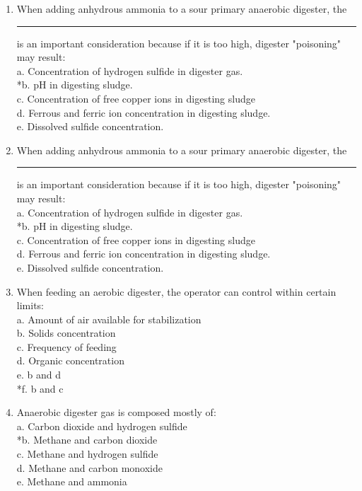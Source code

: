\documentclass{article}
\begin{document}
\begin{enumerate}
\item  When adding anhydrous ammonia to a sour primary anaerobic digester, the \rule{1.5cm}{0.3mm} is an important consideration because if it is too high, digester "poisoning" may result: \\

a. Concentration of hydrogen sulfide in digester gas. \\
*b. pH in digesting sludge. \\
c. Concentration of free copper ions in digesting sludge \\
d. Ferrous and ferric ion concentration in digesting sludge. \\
e. Dissolved sulfide concentration. \\

\item  When adding anhydrous ammonia to a sour primary anaerobic digester, the \rule{1.5cm}{0.3mm} is an important consideration because if it is too high, digester "poisoning" may result: \\

a. Concentration of hydrogen sulfide in digester gas. \\
*b. pH in digesting sludge. \\
c. Concentration of free copper ions in digesting sludge \\
d. Ferrous and ferric ion concentration in digesting sludge. \\
e. Dissolved sulfide concentration. \\

\item  When feeding an aerobic digester, the operator can control within certain limits: \\

a. Amount of air available for stabilization \\
b. Solids concentration \\
c. Frequency of feeding \\
d. Organic concentration \\
e. b and d \\
*f. b and c \\

\item  Anaerobic digester gas is composed mostly of: \\

a. Carbon dioxide and hydrogen sulfide \\
*b. Methane and carbon dioxide \\
c. Methane and hydrogen sulfide \\
d. Methane and carbon monoxide \\
e. Methane and ammonia \\


\end{enumerate}
\end{document}
